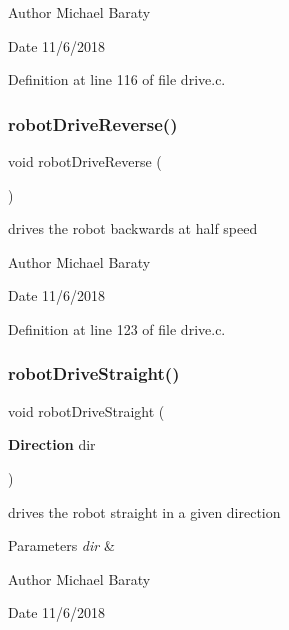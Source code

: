 \begin{DoxyAuthor}{Author}
Michael Baraty 
\end{DoxyAuthor}
\begin{DoxyDate}{Date}
11/6/2018 
\end{DoxyDate}


Definition at line 116 of file drive.\+c.

\mbox{\label{drive_8h_a151c59da152a110b01311c4f893afd3b}} 
\subsubsection{robot\+Drive\+Reverse()}
{\footnotesize\ttfamily void robot\+Drive\+Reverse (\begin{DoxyParamCaption}{ }\end{DoxyParamCaption})}



drives the robot backwards at half speed 

\begin{DoxyAuthor}{Author}
Michael Baraty 
\end{DoxyAuthor}
\begin{DoxyDate}{Date}
11/6/2018 
\end{DoxyDate}


Definition at line 123 of file drive.\+c.

\mbox{\label{drive_8h_a014c2a00d938c4e3c8aa626ac60e2765}} 
\subsubsection{robot\+Drive\+Straight()}
{\footnotesize\ttfamily void robot\+Drive\+Straight (\begin{DoxyParamCaption}\item[{\textbf{ Direction}}]{dir }\end{DoxyParamCaption})}



drives the robot straight in a given direction 


\begin{DoxyParams}{Parameters}
{\em dir} & \\
\hline
\end{DoxyParams}
\begin{DoxyAuthor}{Author}
Michael Baraty 
\end{DoxyAuthor}
\begin{DoxyDate}{Date}
11/6/2018 
\end{DoxyDate}


